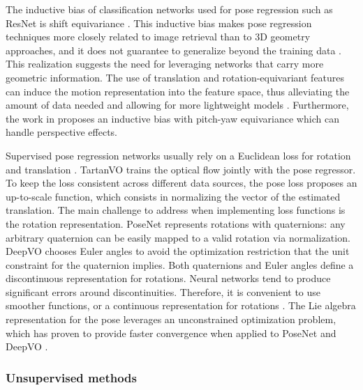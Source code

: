 The inductive bias of classification networks used for pose regression such as ResNet is shift equivariance \cite{dl:vo:cotogni2022offset}. This inductive bias makes pose regression techniques more closely related to image retrieval than to 3D geometry approaches, and it does not guarantee to generalize beyond the training data \cite{dl:vo:19cnnlimitations}. This realization suggests the need for leveraging networks that carry more geometric information.
The use of translation and rotation-equivariant features can induce the motion representation into the feature space, thus alleviating the amount of data needed and allowing for more lightweight models \cite{dl:vo:equivfeaturesforposeregression,dl:vo:zhang2020rotationequivariance}. Furthermore, the work in \cite{dl:vo:brynte2022rigidity} proposes an inductive bias with pitch-yaw equivariance which can handle perspective effects. 

Supervised pose regression networks usually rely on a Euclidean loss for rotation and translation \cite{kendall2015posenet, wang2017deepvo,dl:vo:wang2020atloc,dl:vo:xue2019guidedatt}. TartanVO trains the optical flow jointly with the pose regressor. To keep the loss consistent across different data sources, the pose loss proposes an up-to-scale function, which consists in normalizing the vector of the estimated translation.
The main challenge to address when implementing loss functions is the rotation representation.
PoseNet represents rotations with quaternions: any arbitrary quaternion can be easily mapped to a valid rotation via normalization. DeepVO chooses Euler angles to avoid the optimization restriction that the unit constraint for the quaternion implies. Both quaternions and Euler angles define a discontinuous representation for rotations. Neural networks tend to produce significant errors around discontinuities. Therefore, it is convenient to use smoother functions, or a continuous representation for rotations \cite{zhou2019continuity, dl:vo:isr}. The Lie algebra representation for the pose leverages an unconstrained optimization problem, which has proven to provide faster convergence when applied to PoseNet \cite{dl:frontend:lieposenet} and DeepVO \cite{dl:vo:deepvo-graph,dl:vo:isr}. 





\subsubsection{Unsupervised methods}

